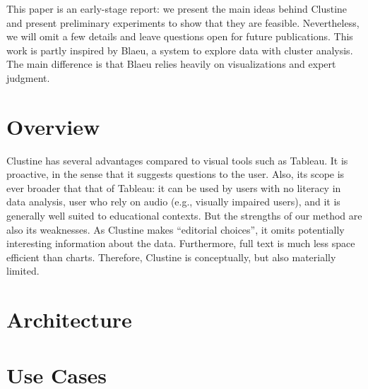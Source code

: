 This paper is an early-stage report: we present the main ideas behind Clustine
and present preliminary experiments to show that they are feasible.
Nevertheless, we will omit a few details and leave questions open for future
publications. This work is partly inspired by Blaeu, a system to explore data
with cluster analysis. The main difference is that Blaeu relies heavily on
visualizations and expert judgment.

\section{Overview}
\label{sec:overview}

Clustine has several advantages compared to visual tools such as Tableau. It is
proactive, in the sense that it suggests questions to the user. Also, its scope
is ever broader that that of Tableau: it can be used by users with no literacy
in data analysis, user who rely on audio (e.g., visually impaired users), and
it is generally well suited to educational contexts. But the strengths of our
method are also its weaknesses. As Clustine makes ``editorial choices'', it
omits potentially interesting information about the data. Furthermore, full
text is much less space efficient than charts. Therefore, Clustine is
conceptually, but also materially limited.

\section{Architecture}
\label{sec:architecture}

\section{Use Cases}
\label{sec:demo}

